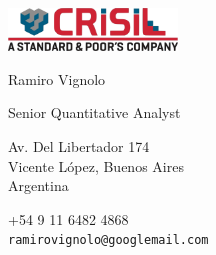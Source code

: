 \documentclass{article}
\begin{document}
\AddToShipoutPicture{\BackgroundPic}


\vspace{0.5cm plus \chico minus \chico}

\begin{minipage}{0.3\linewidth}




\end{minipage}
\begin{minipage}{0.4\linewidth}

\begin{center}
\href{http://www.crisil.com}{\includegraphics[width=4.5cm]{logos/crisil-2}}\\

\smallskip

\textsf{Ramiro Vignolo}
\par
\textsf{Senior Quantitative Analyst}\\

\medskip

Av. Del Libertador 174\\
Vicente López, Buenos Aires\\
Argentina
\end{center}


\begin{center}
+54 9 11 6482 4868\\
\textcolor{azul}{\texttt{ramirovignolo@googlemail.com}}\\


\end{center}
\end{minipage}
\end{document}
